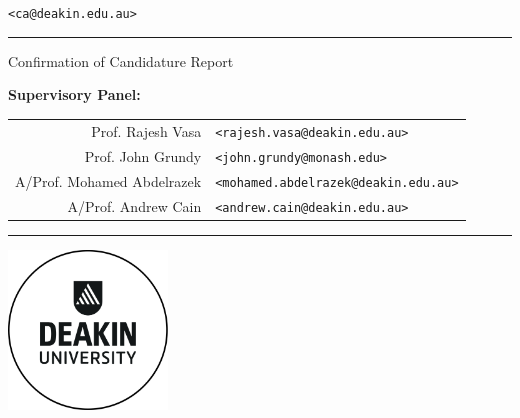 \vspace*{\fill}
\thispagestyle{empty}
\linespread{1.2}

\centering

\Large
\textbf{\thetitle{}}
\vspace{0.9 cm}


\theauthor{}\\
\normalsize \theauthorspostnominals{}\\
\texttt{<ca@deakin.edu.au>}
\vspace{0.75 cm}

%
\large
\hrule
\bigskip
Confirmation of Candidature Report

\small
\medskip
\upshape
\textbf{Supervisory Panel:}\medskip

\begin{tabular}{r l}
Prof. Rajesh Vasa & \texttt{<rajesh.vasa@deakin.edu.au>}\\
Prof. John Grundy & \texttt{<john.grundy@monash.edu>}\\
A/Prof. Mohamed Abdelrazek & \texttt{<mohamed.abdelrazek@deakin.edu.au>}\\
A/Prof. Andrew Cain & \texttt{<andrew.cain@deakin.edu.au>}
\end{tabular}
\bigskip
\hrule

\vspace{2 cm}
\includegraphics[width=120pt]{frontmatter/figures/deakin}
\vspace{2 cm}

\upshape\large
\thedepartment{}\\
\theinstitution{}\\
\thelocation

\vspace{1cm}
\thedate{}
\vspace*{\fill}

\justify
\normalsize
\restoregeometry
